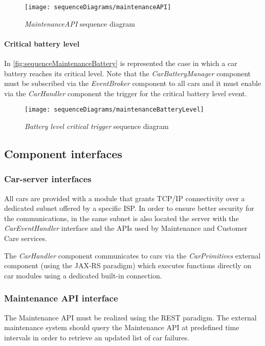 \begin{figure}[h!]
	\centering
	\texttt{[image: sequenceDiagrams/maintenanceAPI]}
	\caption{
		\label{fig:sequenceMaintenanceAPI} 
		\emph{MaintenanceAPI} sequence diagram
	}
\end{figure}

\clearpage
\paragraph{Critical battery level}In \autoref{fig:sequenceMaintenanceBattery} is represented the case in which a car battery reaches its critical level. Note that the \emph{CarBatteryManager} component must be subscribed via the \mbox{\emph{EventBroker}} component to all cars and it must enable via the \emph{CarHandler} component the trigger for the critical battery level event.
\begin{figure}[h!]
	\centering
	\texttt{[image: sequenceDiagrams/maintenanceBatteryLevel]}
	\caption{
		\label{fig:sequenceMaintenanceBattery} 
		\emph{Battery level critical trigger} sequence diagram
	}
\end{figure}

\clearpage
\subsection{Component interfaces}

\subsubsection{Car-server interfaces}
All cars are provided with a module that grants TCP/IP connectivity over a dedicated subnet offered by a specific ISP. In order to ensure better security for the communications, in the same subnet is also located the server with the \mbox{\emph{CarEventHandler}} interface and the APIs used by Maintenance and Customer Care services.

The \emph{CarHandler} component communicates to cars via the \mbox{\emph{CarPrimitives}} external component (using the JAX-RS paradigm) which executes functions directly on car modules using a dedicated built-in connection.

\subsubsection{Maintenance API interface}
The Maintenance API must be realized using the REST paradigm. The external maintenance system should query the Maintenance API at predefined time intervals in order to retrieve an updated list of car failures.

